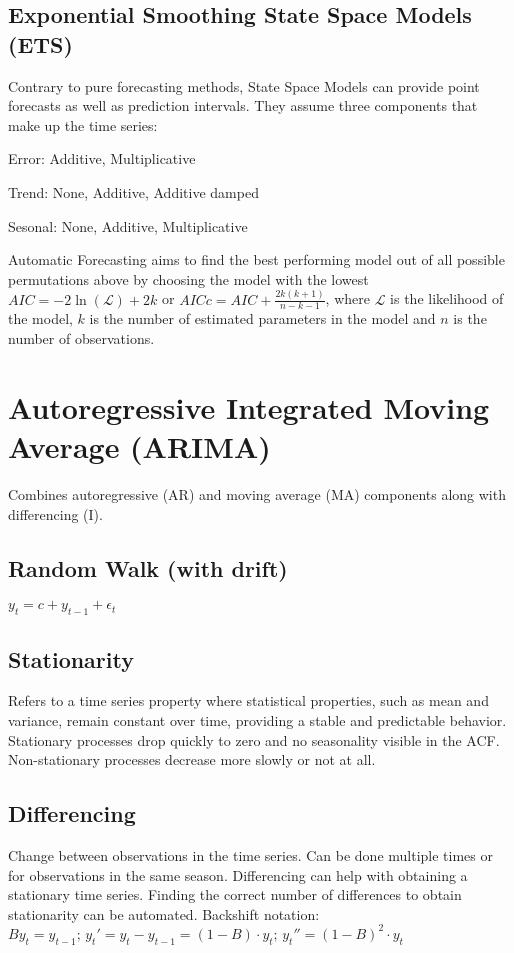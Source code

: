 \subsection{Exponential Smoothing State Space Models (ETS)}
Contrary to pure forecasting methods, State Space Models can provide point forecasts as well as prediction intervals.
They assume three components that make up the time series:

Error: {Additive, Multiplicative}

Trend: {None, Additive, Additive damped}

Sesonal: {None, Additive, Multiplicative}

\noindent
Automatic Forecasting aims to find the best performing model out of all possible permutations above by choosing
the model with the lowest $ AIC = -2 \ln(\mathcal{L}) + 2k $ or $ AICc = AIC + \frac{2k(k+1)}{n-k-1} $,
where $ \mathcal{L} $ is the likelihood of the model, $ k $ is the number of estimated parameters in the model and $ n $ is the number of observations.

\section{Autoregressive Integrated Moving Average (ARIMA)}
Combines autoregressive (AR) and moving average (MA) components along with differencing (I).

\subsection{Random Walk (with drift)}
$ y_t = c + y_{t-1} + \epsilon_t $

\subsection{Stationarity}
Refers to a time series property where statistical properties, such as mean and variance, remain constant over time,
providing a stable and predictable behavior. Stationary processes drop quickly to zero and no seasonality visible in the ACF.
Non-stationary processes decrease more slowly or not at all.

\subsection{Differencing}
Change between observations in the time series. Can be done multiple times or for observations in the same season.
Differencing can help with obtaining a stationary time series. Finding the correct number of differences to obtain stationarity can be automated.
Backshift notation: $ By_t = y_{t-1} \text{; } y_t' = y_t - y_{t-1} = (1 - B) \cdot y_t \text{; } y_t'' = (1 - B)^2 \cdot y_t$

